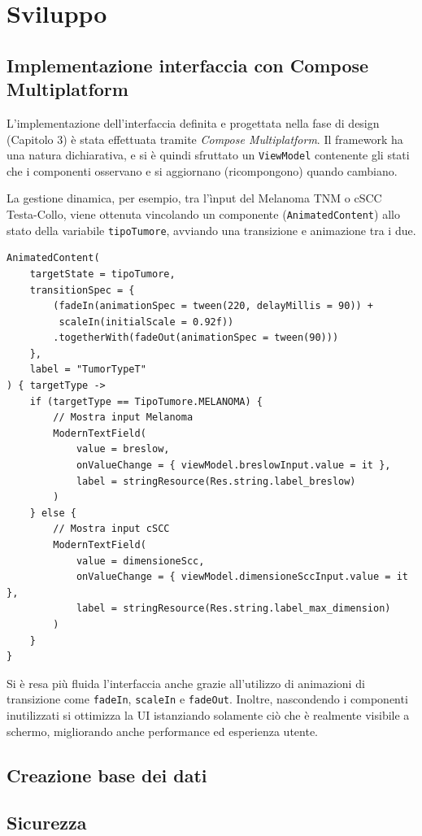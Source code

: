 
\chapter{Sviluppo}\label{ch:sviluppo}

\section{Implementazione interfaccia con Compose Multiplatform}\label{sec:implementazione-interfaccia-con-compose-multiplatform}

L'implementazione dell'interfaccia definita e progettata nella fase di design (Capitolo 3) è stata effettuata tramite \textit{Compose Multiplatform}.
Il framework ha una natura dichiarativa, e si è quindi sfruttato un \texttt{ViewModel} contenente gli stati che i componenti osservano e
si aggiornano (ricompongono) quando cambiano.

La gestione dinamica, per esempio, tra l'ìnput del Melanoma TNM o cSCC Testa-Collo, viene ottenuta vincolando un componente
(\texttt{AnimatedContent}) allo stato della variabile \texttt{tipoTumore}, avviando una transizione e animazione tra i due.


\begin{verbatim}
AnimatedContent(
    targetState = tipoTumore,
    transitionSpec = {
        (fadeIn(animationSpec = tween(220, delayMillis = 90)) +
         scaleIn(initialScale = 0.92f))
        .togetherWith(fadeOut(animationSpec = tween(90)))
    },
    label = "TumorTypeT"
) { targetType ->
    if (targetType == TipoTumore.MELANOMA) {
        // Mostra input Melanoma
        ModernTextField(
            value = breslow,
            onValueChange = { viewModel.breslowInput.value = it },
            label = stringResource(Res.string.label_breslow)
        )
    } else {
        // Mostra input cSCC
        ModernTextField(
            value = dimensioneScc,
            onValueChange = { viewModel.dimensioneSccInput.value = it },
            label = stringResource(Res.string.label_max_dimension)
        )
    }
}
\end{verbatim}

Si è resa più fluida l'interfaccia anche grazie all'utilizzo di animazioni di transizione come \texttt{fadeIn}, \texttt{scaleIn} e \texttt{fadeOut}.
Inoltre, nascondendo i componenti inutilizzati si ottimizza la UI istanziando solamente ciò che è realmente visibile a schermo, migliorando anche performance ed esperienza utente.

\section{Creazione base dei dati}\label{sec:creazione-base-dei-dati}


\section{Sicurezza}\label{sec:sicurezza}

